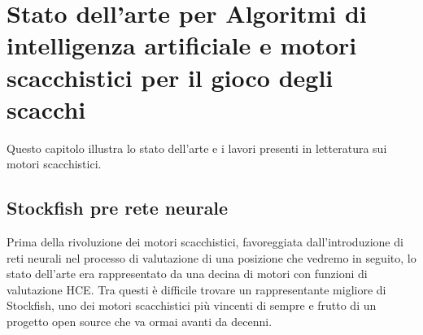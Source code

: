 \chapter{Stato dell'arte per Algoritmi di intelligenza artificiale e motori scacchistici  per il gioco degli scacchi} %
%

\begin{citazione}
Questo capitolo illustra lo stato dell'arte e i lavori presenti in letteratura sui motori scacchistici.
\end{citazione}

\newpage


\section{Stockfish pre rete neurale }
Prima della rivoluzione dei motori scacchistici, favoreggiata dall'introduzione di reti neurali nel processo di valutazione di una posizione che vedremo in seguito, lo stato dell'arte era rappresentato
da una decina di motori con funzioni di valutazione HCE. Tra questi è difficile trovare un rappresentante migliore di Stockfish, uno dei motori scacchistici più vincenti di sempre e frutto di un progetto
open source che va ormai avanti da decenni.

